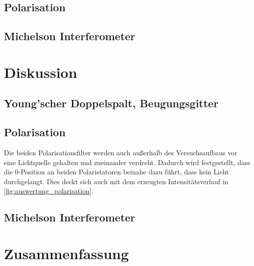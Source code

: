 \documentclass[12pt,english,ngerman]{scrartcl}
\begin{document}
\subsection{Polarisation}



\subsection{Michelson Interferometer}

\section{Diskussion}\label{sec:diskussion}

\subsection{Young'scher Doppelspalt, Beugungsgitter}


\subsection{Polarisation}

Die beiden Polarisationsfilter werden auch außerhalb des Versuchsaufbaus vor eine Lichtquelle gehalten und 
zueinander verdreht. Dadurch wird festgestellt, dass die 0-Position an beiden Polaristatoren beinahe dazu führt, dass 
kein Licht durchgelangt. Dies deckt sich auch mit dem erzeugten Intensitätsverlauf in \autoref{fig:auswertung_polarisation}.

\subsection{Michelson Interferometer}

\section{Zusammenfassung}\label{sec:zusammenfassung}
\end{document}

